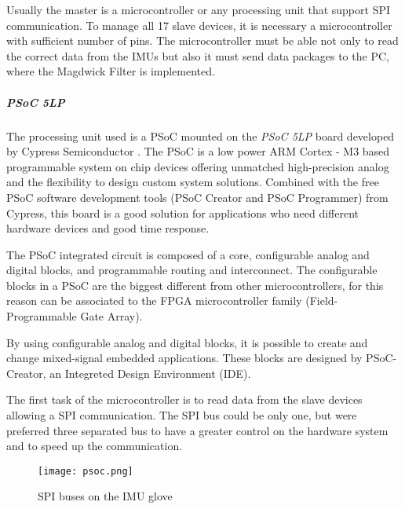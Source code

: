 Usually the master is a microcontroller  or any processing unit that support SPI communication. To manage all 17 slave devices,  it is necessary a microcontroller with sufficient number of pins. The microcontroller must be able not only to read the correct data from the IMUs but also it must send  data packages to the PC, where the Magdwick Filter is implemented.   \\
\newline

\subparagraph{PSoC 5LP}

The processing unit used is a PSoC mounted on the \textit{PSoC 5LP} board developed by Cypress Semiconductor \cite{riferimento}. The PSoC is a low power ARM \textsuperscript \textregistered Cortex - M3 based programmable system on chip devices offering unmatched high-precision analog and the flexibility to design custom system solutions. Combined with the free PSoC software development tools (PSoC Creator and
PSoC Programmer) from Cypress, this board is a good solution for applications who need different hardware devices and good time response. %

The PSoC integrated circuit is composed of a core, configurable analog and digital blocks, and programmable routing and interconnect. The configurable blocks in a PSoC are the biggest different from other microcontrollers, for this reason can be associated to the FPGA microcontroller family (Field-Programmable Gate Array). 

By using configurable analog and digital blocks, it is possible to  create and change mixed-signal embedded applications. These blocks are designed by PSoC-Creator, an Integreted Design Environment (IDE).  

The first task of the microcontroller is to read data from the slave devices allowing a SPI communication. The SPI bus could be only one, but were preferred three separated bus to have a greater control on the hardware system and to speed up the communication. 
\begin{figure}[h]
\centering
\texttt{[image: psoc.png]}
\caption{SPI buses on the IMU glove}
\label{fig:spibuses}
\end{figure}

